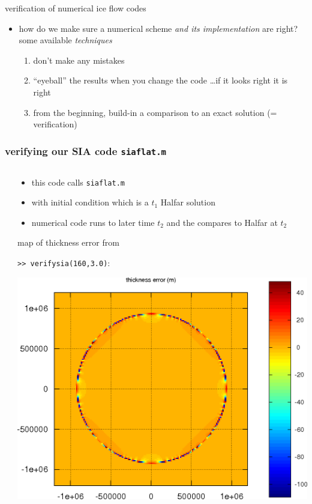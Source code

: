 \begin{frame}{verification of numerical ice flow codes}
\begin{itemize}
\item how do we make sure a numerical scheme \emph{and its implementation} are right?  some available \emph{techniques}
  \begin{enumerate}
  \item  don't make any mistakes
  \item  ``eyeball'' the results when you change the code \dots if it looks right it is right
  \item  from the beginning, build-in a comparison to an exact solution (= verification)
  \end{enumerate}
\end{itemize}
\end{frame}


\begin{frame}[fragile]
\frametitle{verifying our SIA code \texttt{siaflat.m}}

\begin{columns}
\begin{column}{0.6\textwidth}
\end{column}

\begin{column}{0.4\textwidth}
\small
\begin{itemize}
\item this code calls \texttt{siaflat.m}
\item with initial condition which is a $t_1$ Halfar solution
\item numerical code runs to later time $t_2$ and the compares to Halfar at $t_2$
\end{itemize}

\bigskip
\scriptsize
map of thickness error from

\qquad \texttt{>> verifysia(160,3.0)}:

\includegraphics[width=1.0\textwidth]{photos/siaerror}
\end{column}
\end{columns}
\end{frame}


